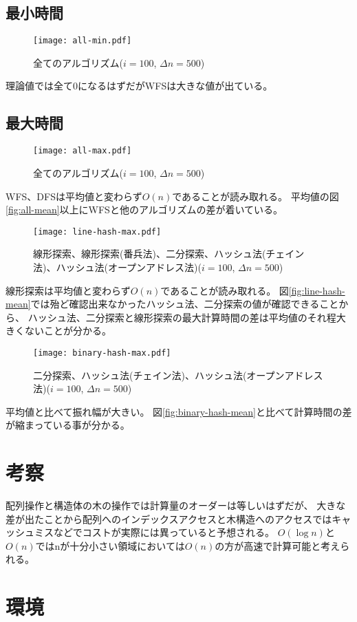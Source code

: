 \documentclass[dvipdfmx]{jsarticle}
\begin{document}
		\subsection{最小時間}
			\begin{figure}[H]
				\caption{全てのアルゴリズム($i = 100$, $\Delta n = 500$)}
				\texttt{[image: all-min.pdf]}
			\end{figure}
			理論値では全て0になるはずだがWFSは大きな値が出ている。
		\subsection{最大時間}
			\begin{figure}[H]
				\caption{全てのアルゴリズム($i = 100$, $\Delta n = 500$)}
				\texttt{[image: all-max.pdf]}
			\end{figure}
			WFS、DFSは平均値と変わらず$O(n)$であることが読み取れる。
			平均値の図\ref{fig:all-mean}以上にWFSと他のアルゴリズムの差が着いている。
			\begin{figure}[H]
				\caption{線形探索、線形探索(番兵法)、二分探索、ハッシュ法(チェイン法)、ハッシュ法(オープンアドレス法)($i = 100$, $\Delta n = 500$)}
				\texttt{[image: line-hash-max.pdf]}
			\end{figure}
			線形探索は平均値と変わらず$O(n)$であることが読み取れる。
			図\ref{fig:line-hash-mean}では殆ど確認出来なかったハッシュ法、二分探索の値が確認できることから、
			ハッシュ法、二分探索と線形探索の最大計算時間の差は平均値のそれ程大きくないことが分かる。
			\begin{figure}[H]
				\caption{二分探索、ハッシュ法(チェイン法)、ハッシュ法(オープンアドレス法)($i = 100$, $\Delta n = 500$)}
				\texttt{[image: binary-hash-max.pdf]}
			\end{figure}
			平均値と比べて振れ幅が大きい。
			図\ref{fig:binary-hash-mean}と比べて計算時間の差が縮まっている事が分かる。
	\section{考察}
		配列操作と構造体の木の操作では計算量のオーダーは等しいはずだが、
		大きな差が出たことから配列へのインデックスアクセスと木構造へのアクセスではキャッシュミスなどでコストが実際には異っていると予想される。
		$O(\log n)$と$O(n)$ではnが十分小さい領域においては$O(n)$の方が高速で計算可能と考えられる。
	\section{環境}
\end{document}
